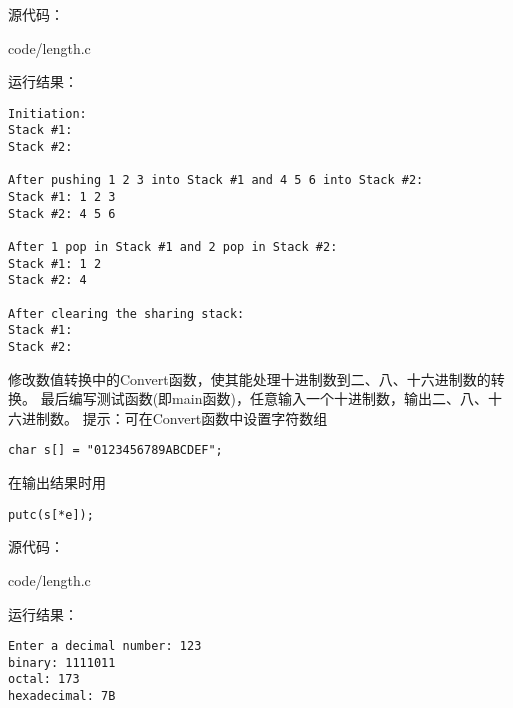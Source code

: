 \documentclass[10pt,a4paper,twoside,openright,titlepage,fleqn,
tablecaptionabove]{article}
\begin{document}
\begin{CJK}{UTF8}{gkai}
\begin{jie}
源代码：

{code/length.c}


运行结果：%
\begin{lstlisting}
Initiation:
Stack #1: 
Stack #2:

After pushing 1 2 3 into Stack #1 and 4 5 6 into Stack #2:
Stack #1: 1 2 3
Stack #2: 4 5 6

After 1 pop in Stack #1 and 2 pop in Stack #2:
Stack #1: 1 2 
Stack #2: 4 

After clearing the sharing stack:
Stack #1:  
Stack #2:  
\end{lstlisting}

\end{jie}

\begin{wenti}
修改数值转换中的Convert函数，使其能处理十进制数到二、八、十六进制数的转换。
最后编写测试函数(即main函数)，任意输入一个十进制数，输出二、八、十六进制数。
提示：可在Convert函数中设置字符数组
\begin{lstlisting}
char s[] = "0123456789ABCDEF";
\end{lstlisting}
在输出结果时用
\begin{lstlisting}
putc(s[*e]); 
\end{lstlisting}
\end{wenti}

\begin{jie}
源代码：%

{code/length.c}

运行结果：%
\begin{lstlisting} 
Enter a decimal number: 123
binary: 1111011    
octal: 173
hexadecimal: 7B
\end{lstlisting}
	
\end{jie}

 

\end{CJK}
\end{document}
